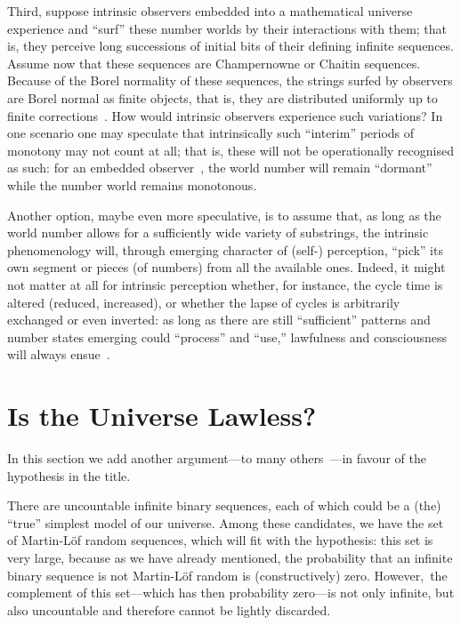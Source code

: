 \documentclass[12pt]{article}
\begin{document}
Third, suppose  intrinsic observers embedded into a mathematical universe experience and ``surf''  these number worlds by their interactions with them;
that is, they perceive long successions of initial bits of their defining infinite sequences.
Assume now that  these sequences are  Champernowne or Chaitin  sequences.
Because of the Borel normality of these sequences, the strings surfed by observers are
Borel normal  as finite objects,
that is, they are distributed uniformly up to finite corrections~\cite{DBLP:conf/dlt/Calude93}.
How would intrinsic observers experience such variations?
In one scenario one may speculate that intrinsically such ``interim'' periods of monotony may not count at all; that is,
these will not be operationally recognised as such:
for an embedded observer~\cite{toffoli:79,svozil-94}, the  world number will remain ``dormant'' while the number world remains monotonous.

Another option, maybe even more speculative, is to assume that, as long as the world number allows for a sufficiently wide variety of substrings,
the intrinsic
phenomenology will, through  emerging character of (self-) perception, ``pick'' its own segment or pieces (of numbers) from all the available ones.
Indeed, it might not matter at all for intrinsic perception whether, for instance, the cycle time is altered (reduced, increased),
or whether the lapse of cycles is arbitrarily exchanged or even inverted:
as long as there are still ``sufficient'' patterns and number states emerging could ``process'' and ``use,''
lawfulness and consciousness will always ensue~\cite{permutationcity}.


\section{Is the Universe Lawless?}
\label{lawless}

In this section we add another argument---to many others~\cite{armstrong_1983,vanFraassen1989-VANLAS,calude1999islawful,lawlses_rosen2010,calude2013theeinai,chaos_multiverse2017,Mueller-2017,Cabello-2018-BornRule}---in favour of the hypothesis in the title.

There are uncountable infinite binary sequences, each of which could be a (the) ``true'' simplest model of our universe.
Among these candidates, we have the set of Martin-L\"of random sequences,
which will fit with the hypothesis:
this set is very large, because as we have already mentioned,
the probability that an infinite binary sequence is not Martin-L\"of random is (constructively) zero.
However,~the complement of this set---which has then probability zero---is not only infinite,
but also uncountable and therefore cannot be lightly discarded.
\end{document}
